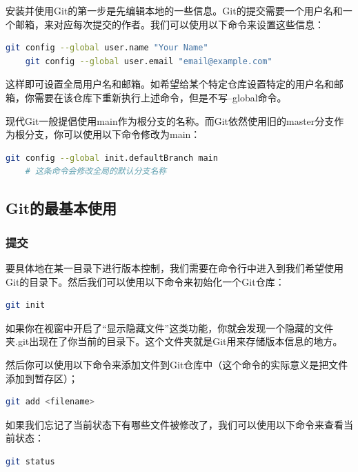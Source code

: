 \documentclass[../main.tex]{subfiles}
\begin{document}
安装并使用Git的第一步是先编辑本地的一些信息。Git的提交需要一个用户名和一个邮箱，来对应每次提交的作者。我们可以使用以下命令来设置这些信息：

\begin{lstlisting}[language=bash]
    git config --global user.name "Your Name"
    git config --global user.email "email@example.com"
\end{lstlisting}

这样即可设置全局用户名和邮箱。如希望给某个特定仓库设置特定的用户名和邮箱，你需要在该仓库下重新执行上述命令，但是不写--global命令。

现代Git一般提倡使用main作为根分支的名称。而Git依然使用旧的master分支作为根分支，你可以使用以下命令修改为main：

\begin{lstlisting}[language=bash]
    git config --global init.defaultBranch main 
    # 这条命令会修改全局的默认分支名称
\end{lstlisting}

\subsection{Git的最基本使用}

\subsubsection{提交}

要具体地在某一目录下进行版本控制，我们需要在命令行中进入到我们希望使用Git的目录下。然后我们可以使用以下命令来初始化一个Git仓库：

\begin{lstlisting}[language=bash]
    git init
\end{lstlisting}

如果你在视窗中开启了“显示隐藏文件”这类功能，你就会发现一个隐藏的文件夹.git出现在了你当前的目录下。这个文件夹就是Git用来存储版本信息的地方。

然后你可以使用以下命令来添加文件到Git仓库中（这个命令的实际意义是把文件添加到暂存区）；

\begin{lstlisting}[language=bash]
    git add <filename>
\end{lstlisting}

如果我们忘记了当前状态下有哪些文件被修改了，我们可以使用以下命令来查看当前状态：
\begin{lstlisting}[language=bash]
    git status
\end{lstlisting}
\end{document}
